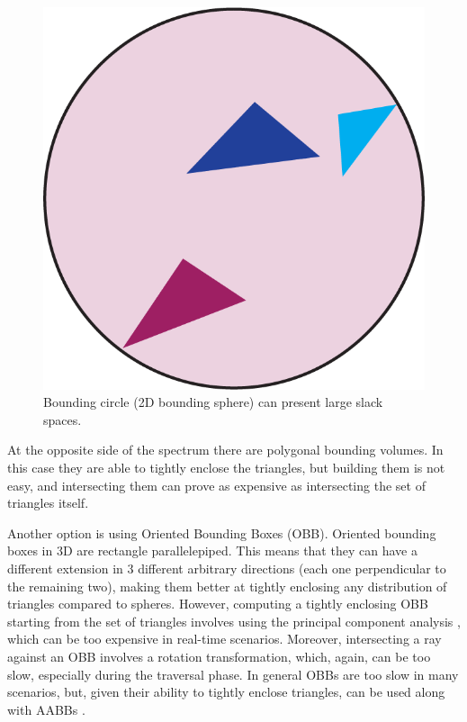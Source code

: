 \documentclass{PoliMi_MasterThesis}
\begin{document}
\begin{figure}[H]
    \centering
    \includegraphics[width=\textwidth*\real{0.25}]{Images/bounding_sphere_slack.png}
    \caption{Bounding circle (2D bounding sphere) can present large slack spaces.}
    \label{fig:bounding_sphere}
\end{figure}

At the opposite side of the spectrum there are polygonal bounding volumes. In this case they are able to tightly enclose the triangles, but building them is not easy, and intersecting them can prove as expensive as intersecting the set of triangles itself.

Another option is using Oriented Bounding Boxes (OBB). Oriented bounding boxes in 3D are rectangle parallelepiped. This means that they can have a different extension in 3 different arbitrary directions (each one perpendicular to the remaining two), making them better at tightly enclosing any distribution of triangles compared to spheres. However, computing a tightly enclosing OBB starting from the set of triangles involves using the principal component analysis \cite{obb_construction}, which can be too expensive in real-time scenarios. Moreover, intersecting a ray against an OBB involves a rotation transformation, which, again, can be too slow, especially during the traversal phase. In general OBBs are too slow in many scenarios, but, given their ability to tightly enclose triangles, can be used along with AABBs \cite{obbs_for_bvhs}.
\end{document}
